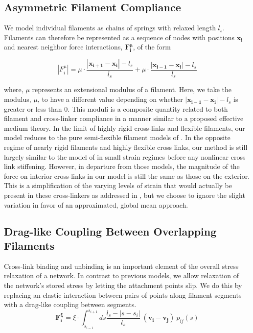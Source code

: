 \documentclass[10pt,letterpaper]{article}
\begin{document}
\subsection*{Asymmetric Filament Compliance}
We model individual filaments as chains of springs with relaxed length $l_s$.  Filaments can therefore be represented as a sequence of nodes with positions $\mathbf{x_i}$ and nearest neighbor force interactions, $\mathbf{F^{\mu}_i}$, of the form

\begin{equation}
|F^{\mu}_i| = \mu\cdot\frac{|\mathbf{x_{i+1}}-\mathbf{x_i}|-l_s}{l_s} +\mu\cdot\frac{|\mathbf{x_{i-1}}-\mathbf{x_i}|-l_s}{l_s}
\end{equation}





where, $\mu$ represents an extensional modulus of a filament.   Here, we take the modulus, $\mu$, to have a different value depending on whether $|\mathbf{x_{i-1}}-\mathbf{x_i}|-l_s$ is greater or less than 0.  This moduli is a composite quantity related to both filament and cross-linker compliance in a manner similar to a proposed effective medium theory\cite{theo_crosslinknonlinear}.  In the limit of highly rigid cross-links and flexible filaments, our model reduces to the pure semi-flexible filament models of \cite{theo_hlm,theo_hlm2}.  In the opposite regime of nearly rigid filaments and highly flexible cross links, our method is still largely similar to the model of \cite{theo_crosslinknonlinear} in small strain regimes before any nonlinear cross link stiffening.  However, in departure from those models, the magnitude of the force on interior cross-links in our model is still the same as those on the exterior.  This is a simplification of the varying levels of strain that would actually be present in these cross-linkers as addressed in \cite{theo_crosslinknonlinear}, but we choose to ignore the slight variation in favor of an approximated, global mean approach.  



\subsection*{Drag-like Coupling Between Overlapping Filaments}
\label{exp_drag}
Cross-link binding and unbinding is an important element of the overall stress relaxation of a network.  In contrast to previous models, we allow relaxation of the network's stored stress by letting the attachment points slip.  We do this by replacing an elastic interaction between pairs of points along filament segments with a drag-like coupling between segments.
\begin{equation}
\mathbf{F^{\xi}_i} = \xi \cdot \int^{s_{i+1}}_{s_{i-1}} ds \frac{l_s-|s-s_i|}{l_s} \: (\mathbf{v_i}-\mathbf{v_j}) \: p_{ij}(s)
\end{equation}
\end{document}

